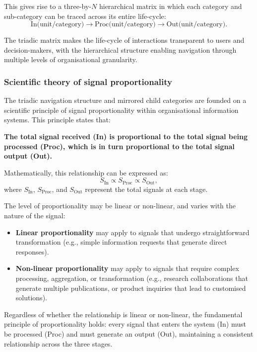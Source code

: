 \documentclass[11pt,a4paper]{article}
\begin{document}
This gives rise to a three-by-\(N\) hierarchical matrix in which each category and sub-category can be traced across its entire life-cycle:
\[
  \text{In(unit/category)} \rightarrow \text{Proc(unit/category)} \rightarrow \text{Out(unit/category)}.
\]

The triadic matrix makes the life-cycle of interactions transparent to users and decision-makers, with the hierarchical structure enabling navigation through multiple levels of organisational granularity.

\subsubsection*{Scientific theory of signal proportionality}

The triadic navigation structure and mirrored child categories are founded on a scientific principle of signal proportionality within organisational information systems. This principle states that:

\textbf{The total signal received (In) is proportional to the total signal being processed (Proc), which is in turn proportional to the total signal output (Out).}

Mathematically, this relationship can be expressed as:
\[
  S_{\text{In}} \propto S_{\text{Proc}} \propto S_{\text{Out}},
\]
where \(S_{\text{In}}\), \(S_{\text{Proc}}\), and \(S_{\text{Out}}\) represent the total signals at each stage.

The level of proportionality may be linear or non-linear, and varies with the nature of the signal:
\begin{itemize}[noitemsep]
  \item \textbf{Linear proportionality} may apply to signals that undergo straightforward transformation (e.g., simple information requests that generate direct responses).
  \item \textbf{Non-linear proportionality} may apply to signals that require complex processing, aggregation, or transformation (e.g., research collaborations that generate multiple publications, or product inquiries that lead to customised solutions).
\end{itemize}

Regardless of whether the relationship is linear or non-linear, the fundamental principle of proportionality holds: every signal that enters the system (In) must be processed (Proc) and must generate an output (Out), maintaining a consistent relationship across the three stages.
\end{document}
